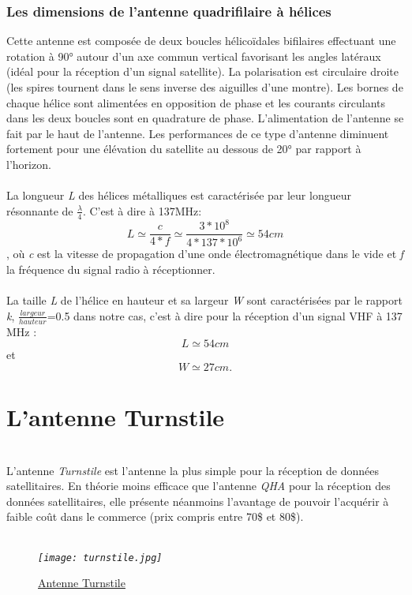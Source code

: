 \documentclass[12pt,fleqn]{book} %
\begin{document}
\subsubsection{Les dimensions de l'antenne quadrifilaire à hélices}
\noindent Cette antenne est composée de deux boucles hélicoïdales bifilaires effectuant une rotation à 90° autour d'un axe commun vertical favorisant les angles latéraux (idéal pour la réception d'un signal satellite). La polarisation est circulaire droite (les spires tournent dans le sens inverse des aiguilles d'une montre). Les bornes de chaque hélice sont alimentées en opposition de phase et les courants circulants dans les deux boucles sont en quadrature de phase. L'alimentation de l'antenne se fait par le haut de l'antenne. Les performances de ce type d'antenne diminuent fortement pour une élévation du satellite au dessous de 20° par rapport à l'horizon.
~\\\\La longueur \emph{L} des hélices métalliques est caractérisée par leur longueur résonnante de \(\frac{\lambda}{4}\). C'est à dire à 137MHz:
$$ L\simeq\frac{c}{4*f}\simeq\frac{3*10^8}{4*137*10^6}\simeq54 cm $$, où \emph{c} est la vitesse de propagation d'une onde électromagnétique dans le vide et \emph{f} la fréquence du signal radio à réceptionner.
~\\\\La taille \emph{L} de l'hélice en hauteur et sa largeur \emph{W} sont caractérisées par le rapport \emph{k}, \(\frac{largeur}{hauteur}\)=0.5 dans notre cas, c'est à dire pour la réception d'un signal VHF à 137 MHz : 
$$ L\simeq54 cm $$
et 
$$ W\simeq27 cm. $$
\section{L'antenne Turnstile}
~\\\indent L'antenne \emph{Turnstile} est l'antenne la plus simple pour la réception de données satellitaires. En théorie moins efficace que l'antenne \emph{QHA} pour la réception des données satellitaires, elle présente néanmoins l'avantage de pouvoir l'acquérir à faible coût dans le commerce (prix compris entre 70\$ et 80\$).
~\\\\
\begin{figure}[H]
	\centering
	\itshape
	\texttt{[image: turnstile.jpg]}
	\caption{\label{turnstile} \underline{Antenne Turnstile}}
\end{figure}
~\\
\end{document}
